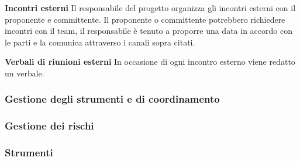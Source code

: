 \textbf{Incontri esterni} \newline \newline
Il responsabile del progetto organizza gli incontri esterni con il proponente e committente. Il proponente o committente potrebbero richiedere incontri con il team, il responsabile è tenuto a proporre una data in accordo con le parti e la comunica attraverso i canali sopra citati. \newline \newline

\textbf{Verbali di riunioni esterni} \newline \newline
In occasione di ogni incontro esterno viene redatto un verbale.
\newline \newline
\subsubsection{Gestione degli strumenti e di coordinamento}
\subsubsection{Gestione dei rischi}
\subsubsection{Strumenti}